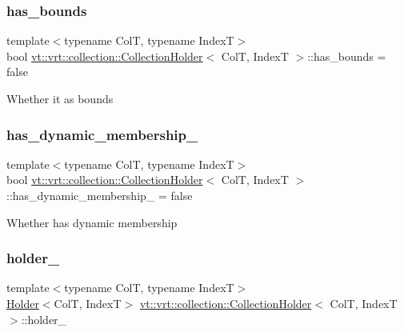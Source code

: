 \subsubsection{\texorpdfstring{has\+\_\+bounds}{has\_bounds}}
{\footnotesize\ttfamily template$<$typename ColT, typename IndexT$>$ \\
bool \hyperlink{structvt_1_1vrt_1_1collection_1_1_collection_holder}{vt\+::vrt\+::collection\+::\+Collection\+Holder}$<$ ColT, IndexT $>$\+::has\+\_\+bounds = false}

Whether it as bounds \mbox{\label{structvt_1_1vrt_1_1collection_1_1_collection_holder_a11cfbe2ada9f49d12ed63ff709aca4cd}} 
\subsubsection{\texorpdfstring{has\+\_\+dynamic\+\_\+membership\+\_\+}{has\_dynamic\_membership\_}}
{\footnotesize\ttfamily template$<$typename ColT, typename IndexT$>$ \\
bool \hyperlink{structvt_1_1vrt_1_1collection_1_1_collection_holder}{vt\+::vrt\+::collection\+::\+Collection\+Holder}$<$ ColT, IndexT $>$\+::has\+\_\+dynamic\+\_\+membership\+\_\+ = false}

Whether has dynamic membership \mbox{\label{structvt_1_1vrt_1_1collection_1_1_collection_holder_a509a3abe1ab350cc1d108030977ab0e9}} 
\subsubsection{\texorpdfstring{holder\+\_\+}{holder\_}}
{\footnotesize\ttfamily template$<$typename ColT, typename IndexT$>$ \\
\hyperlink{structvt_1_1vrt_1_1collection_1_1_holder}{Holder}$<$ColT, IndexT$>$ \hyperlink{structvt_1_1vrt_1_1collection_1_1_collection_holder}{vt\+::vrt\+::collection\+::\+Collection\+Holder}$<$ ColT, IndexT $>$\+::holder\+\_\+}

